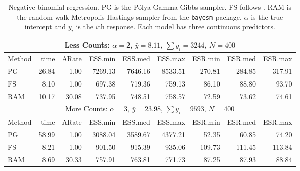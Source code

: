 \documentclass[11pt]{article}
\newcommand{\Polya}{P\'{o}lya}
\newcommand{\tablesize}{\small}
\begin{document}
\begin{table}
\tablesize
\centering
\label{tab:nb-synth}
\begin{tabular}{l r r r r r r r r }
\hline 
\multicolumn{9}{c}{Less Counts: $\alpha = 2$, $\bar y = 8.11$, $\sum y_i = 3244$, $N=400$} \\
\hline
Method  &     time &    ARate &  ESS.min &  ESS.med &  ESS.max &  ESR.min &  ESR.med &  ESR.max \\ 
    PG  &    26.84 &     1.00 &  7269.13 &  7646.16 &  8533.51 &   270.81 &   284.85 &   317.91 \\ 
    FS  &     8.10 &     1.00 &   697.38 &   719.36 &   759.13 &    86.10 &    88.80 &    93.70 \\ 
   RAM  &    10.17 &    30.08 &   737.95 &   748.51 &   758.57 &    72.59 &    73.62 &    74.61 \\
\hline
\multicolumn{9}{c}{More Counts: $\alpha = 3$, $\bar y = 23.98$, $\sum y_i = 9593$, $N=400$} \\
\hline
Method  &     time &    ARate &  ESS.min &  ESS.med &  ESS.max &  ESR.min &  ESR.med &  ESR.max \\ 
    PG  &    58.99 &     1.00 &  3088.04 &  3589.67 &  4377.21 &    52.35 &    60.85 &    74.20 \\ 
    FS  &     8.21 &     1.00 &   901.50 &   915.39 &   935.06 &   109.73 &   111.45 &   113.84 \\ 
   RAM  &     8.69 &    30.33 &   757.91 &   763.81 &   771.73 &    87.25 &    87.93 &    88.84
 \end{tabular}
 \caption{
   Negative binomial regression.  PG is the \Polya-Gamma Gibbs sampler.  FS follows
   \cite{fruhwirth-schnatter-etal-2009}.  RAM is the random walk
   Metropolis-Hastings sampler from the \texttt{bayesm} package. 
   $\alpha$ is the true intercept and $y_i$ is the $i$th response.  Each model
   has three continuous predictors.
 }
\end{table}
\end{document}
